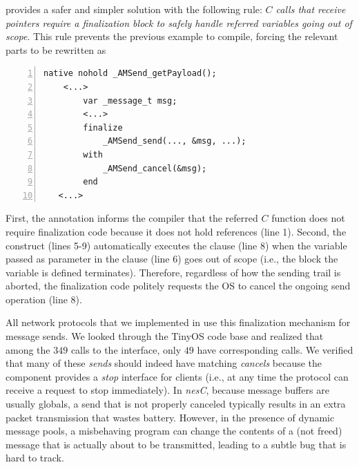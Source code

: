 \CEU provides a safer and simpler solution with the following rule:
\emph{$C$ calls that receive pointers require a finalization block to safely 
handle referred variables going out of scope}.
This rule prevents the previous example to compile, forcing the relevant parts 
to be rewritten as

\noindent
\begin{minipage}{\linewidth}
\begin{lstlisting}[numbers=left,xleftmargin=2em]
native nohold _AMSend_getPayload();
    <...>
        var _message_t msg;
        <...>
        finalize
            _AMSend_send(..., &msg, ...);
        with
            _AMSend_cancel(&msg);
        end
   <...>
\end{lstlisting}
\end{minipage}

First, the  annotation informs the compiler that the referred $C$ 
function does not require finalization code because it does not hold references 
(line 1).
Second, the  construct (lines 5-9) automatically executes the 
 clause (line 8) when the variable passed as parameter in the 
 clause (line 6) goes out of scope (i.e., the block the variable 
is defined terminates).
Therefore, regardless of how the sending trail is aborted, the finalization 
code politely requests the OS to cancel the ongoing send operation (line 8).

All network protocols that we implemented in \CEU use this finalization 
mechanism for message sends.
%
We looked through the TinyOS code base and realized that among the $349$ calls 
to the  interface, only $49$ have corresponding 
 calls.
We verified that many of these \emph{sends} should indeed have matching 
\emph{cancels} because the component provides a \emph{stop} interface for 
clients (i.e., at any time the protocol can receive a request to stop 
immediately).
In \emph{nesC}, because message buffers are usually globals, a send that is not 
properly canceled typically results in an extra packet transmission that 
wastes battery.
However, in the presence of dynamic message pools, a misbehaving program can 
change the contents of a (not freed) message that is actually about to be 
transmitted, leading to a subtle bug that is hard to track.



